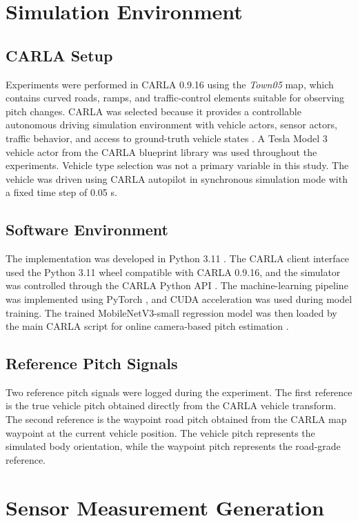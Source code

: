 \documentclass[conference]{IEEEtran}
\begin{document}
\section{Simulation Environment}

\subsection{CARLA Setup}
Experiments were performed in CARLA 0.9.16 using the \textit{Town05} map, which contains curved roads, ramps, and traffic-control elements suitable for observing pitch changes. CARLA was selected because it provides a controllable autonomous driving simulation environment with vehicle actors, sensor actors, traffic behavior, and access to ground-truth vehicle states \cite{dosovitskiy2017carla}. A Tesla Model 3 vehicle actor from the CARLA blueprint library was used throughout the experiments. Vehicle type selection was not a primary variable in this study. The vehicle was driven using CARLA autopilot in synchronous simulation mode with a fixed time step of 0.05 s.

\subsection{Software Environment}
The implementation was developed in Python 3.11 \cite{pythonSoftware}. The CARLA client interface used the Python 3.11 wheel compatible with CARLA 0.9.16, and the simulator was controlled through the CARLA Python API \cite{carlaPythonAPI}. The machine-learning pipeline was implemented using PyTorch \cite{paszke2019pytorch}, and CUDA acceleration was used during model training. The trained MobileNetV3-small regression model was then loaded by the main CARLA script for online camera-based pitch estimation \cite{howard2019mobilenetv3}.

\subsection{Reference Pitch Signals}
Two reference pitch signals were logged during the experiment. The first reference is the true vehicle pitch obtained directly from the CARLA vehicle transform. The second reference is the waypoint road pitch obtained from the CARLA map waypoint at the current vehicle position. The vehicle pitch represents the simulated body orientation, while the waypoint pitch represents the road-grade reference.

\section{Sensor Measurement Generation}
\end{document}
